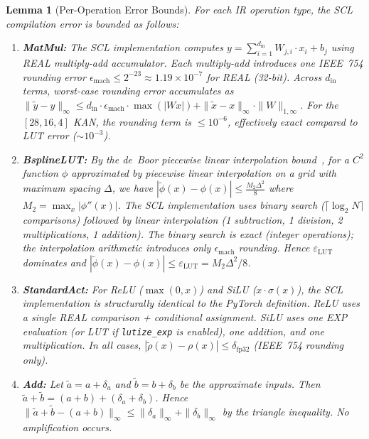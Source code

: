 \documentclass[journal,onecolumn]{IEEEtran}
\newtheorem{lemma}{Lemma}
\begin{document}
\begin{lemma}[Per-Operation Error Bounds]
\label{lem:per_op}
For each IR operation type, the SCL compilation error is bounded as follows:

\begin{enumerate}
    \item \textbf{MatMul:} The SCL implementation computes $y = \sum_{i=1}^{d_{\text{in}}} W_{j,i} \cdot x_i + b_j$ using REAL multiply-add accumulator. Each multiply-add introduces one IEEE~754 rounding error $\epsilon_{\text{mach}} \leq 2^{-23} \approx 1.19 \times 10^{-7}$ for REAL (32-bit). Across $d_{\text{in}}$ terms, worst-case rounding error accumulates as $\|\tilde{y} - y\|_\infty \leq d_{\text{in}} \cdot \epsilon_{\text{mach}} \cdot \max(|Wx|) + \|\tilde{x} - x\|_\infty \cdot \|W\|_{1,\infty}$. For the $[28,16,4]$ KAN, the rounding term is $\leq 10^{-6}$, effectively exact compared to LUT error ($\sim 10^{-3}$).

    \item \textbf{BsplineLUT:} By the de~Boor piecewise linear interpolation bound~\cite{deBoor1978}, for a $C^2$ function $\phi$ approximated by piecewise linear interpolation on a grid with maximum spacing $\Delta$, we have $|\tilde{\phi}(x) - \phi(x)| \leq \frac{M_2 \Delta^2}{8}$ where $M_2 = \max_x |\phi''(x)|$. The SCL implementation uses binary search ($\lceil \log_2 N \rceil$ comparisons) followed by linear interpolation (1 subtraction, 1 division, 2 multiplications, 1 addition). The binary search is exact (integer operations); the interpolation arithmetic introduces only $\epsilon_{\text{mach}}$ rounding. Hence $\varepsilon_{\text{LUT}}$ dominates and $|\tilde{\phi}(x) - \phi(x)| \leq \varepsilon_{\text{LUT}} = M_2 \Delta^2 / 8$.

    \item \textbf{StandardAct:} For ReLU ($\max(0,x)$) and SiLU ($x \cdot \sigma(x)$), the SCL implementation is structurally identical to the PyTorch definition. ReLU uses a single REAL comparison + conditional assignment. SiLU uses one EXP evaluation (or LUT if \texttt{lutize\_exp} is enabled), one addition, and one multiplication. In all cases, $|\tilde{\rho}(x) - \rho(x)| \leq \delta_{\text{fp32}}$ (IEEE~754 rounding only).

    \item \textbf{Add:} Let $\tilde{a} = a + \delta_a$ and $\tilde{b} = b + \delta_b$ be the approximate inputs. Then $\tilde{a}+\tilde{b} = (a+b) + (\delta_a + \delta_b)$. Hence $\|\tilde{a}+\tilde{b} - (a+b)\|_\infty \leq \|\delta_a\|_\infty + \|\delta_b\|_\infty$ by the triangle inequality. No amplification occurs.


\end{enumerate}
\end{lemma}
\end{document}
